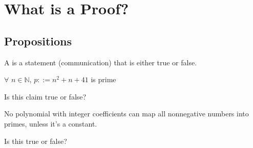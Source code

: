 \chapter{What is a Proof?}
\section{Propositions}
\begin{definition}
    A  is a statement (communication) that is either
    true or false.
\end{definition}
\begin{claim}
    $\forall$ $n \in \mathbb{N}$, $p::=n^2+n+41$ is prime
\end{claim}
 Is this claim true or false?
\begin{claim}
    No polynomial with integer coefficients can map all nonnegative numbers
    into primes, unless it's a constant.
\end{claim}
 Is this true or false?